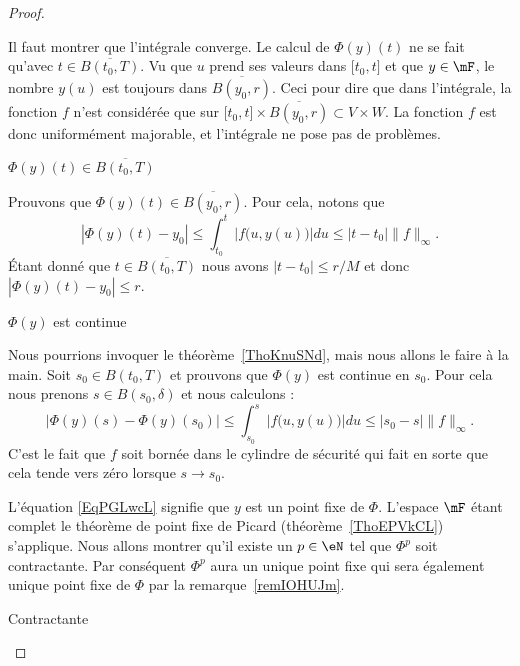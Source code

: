\begin{proof}
\begin{subproof}
\begin{subproof}
        Il faut montrer que l'intégrale converge. Le calcul de \( \Phi(y)(t)\) ne se fait qu'avec \( t\in \overline{ B(t_0,T) }\). Vu que \( u\) prend ses valeurs dans \( \mathopen[ t_0 , t \mathclose]\) et que \( y\in\mF\), le nombre \( y(u)\) est toujours dans \( \overline{ B(y_0,r) }\). Ceci pour dire que dans l'intégrale, la fonction \( f\) n'est considérée que sur \( \mathopen[ t_0 , t \mathclose]\times \overline{ B(y_0,r) }\subset V\times W\). La fonction \( f\) est donc uniformément majorable, et l'intégrale ne pose pas de problèmes.

    \item[\( \Phi(y)(t)\in \overline{ B(t_0,T) }\)]

    Prouvons que \( \Phi(y)(t)\in\overline{ B(y_0,r) }\). Pour cela, notons que
    \begin{equation}
        | \Phi(y)(t)-y_0 |\leq \int_{t_0}^t |f\big( u,y(u) \big)|du\leq | t-t_0 |\| f \|_{\infty}.
    \end{equation}
    Étant donné que \( t\in\overline{ B(t_0,T) }\) nous avons \( | t-t_0 |\leq r/M\) et donc \( | \Phi(y)(t)-y_0 |\leq r\).

    \item[\( \Phi(y)\) est continue]

        Nous pourrions invoquer le théorème~\ref{ThoKnuSNd}, mais nous allons le faire à la main. Soit \( s_0\in B(t_0,T)\) et prouvons que \( \Phi(y)\) est continue en \( s_0\). Pour cela nous prenons \( s\in B(s_0,\delta)\) et nous calculons :
        \begin{equation}
            | \Phi(y)(s)-\Phi(y)(s_0) |\leq \int_{s_0}^s|f\big( u,y(u) \big)|du\leq | s_0-s |\| f \|_{\infty}.
        \end{equation}
        C'est le fait que \( f\) soit bornée dans le cylindre de sécurité qui fait en sorte que cela tende vers zéro lorsque \( s\to s_0\).
    \end{subproof}



    L'équation \eqref{EqPGLwcL} signifie que \( y\) est un point fixe de \( \Phi\). L'espace \( \mF\) étant complet le théorème de point fixe de Picard (théorème~\ref{ThoEPVkCL}) s'applique. Nous allons montrer qu'il existe un \( p\in\eN\) tel que \( \Phi^p\) soit contractante. Par conséquent \( \Phi^p\) aura un unique point fixe qui sera également unique point fixe de \( \Phi\) par la remarque~\ref{remIOHUJm}.

\item[Contractante]


\end{subproof}
\end{proof}
